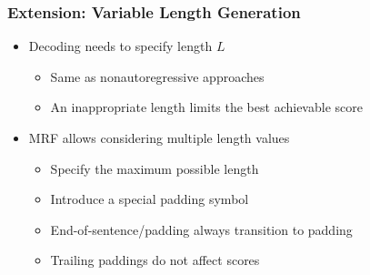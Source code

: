 \documentclass{beamer}
\begin{document}
\begin{frame}
\frametitle{Extension: Variable Length Generation}
\begin{itemize}
    \item<1-> Decoding needs to specify length $L$
    \begin{itemize}
        \item<2-> Same as nonautoregressive approaches
        \item<3-> An inappropriate length limits the best achievable score
    \end{itemize}
    \item<4-> MRF allows considering multiple length values
    \begin{itemize}
        \item<5-> Specify the maximum possible length
        \item<6-> Introduce a special padding symbol
        \item<7-> End-of-sentence/padding always transition to padding
        \item<8-> Trailing paddings do not affect scores
    \end{itemize}
\end{itemize}
\end{frame}
\end{document}
